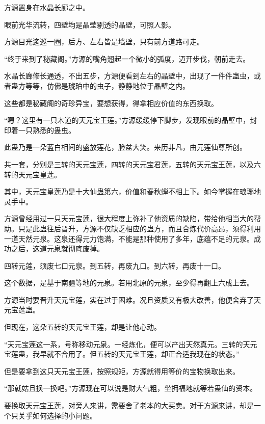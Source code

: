 
\begin{this_body}



方源置身在水晶长廊之中。

眼前光华流转，四壁均是晶莹剔透的晶壁，可照人影。

方源目光逡巡一圈，后方、左右皆是墙壁，只有前方道路可走。

“终于来到了秘藏阁。”方源的嘴角翘起一个微小的弧度，迈开步伐，朝前走去。

水晶长廊修长通透，不出五步，方源便看到左右的晶壁中，出现了一件件蛊虫，或者蛊方等等，仿佛是琥珀中的虫子，静静地位于晶壁之内。

这些都是秘藏阁的奇珍异宝，要想获得，得拿相应价值的东西换取。

“嗯？这里有一只木道的天元宝王莲。”方源缓缓停下脚步，发现眼前的晶壁中，封印着一只熟悉的蛊虫。

此蛊乃是一朵蓝白相间的盛放莲花，脸盆大笑。来历非凡，由元莲仙尊所创。

共一套，分别是三转的天元宝莲，四转的天元宝君莲，五转的天元宝王莲，以及六转的天元宝皇莲。

其中，天元宝皇莲乃是十大仙蛊第六，价值和春秋蝉不相上下。如今掌握在琅琊地灵手中。

方源曾经用过一只天元宝莲，很大程度上弥补了他资质的缺陷，带给他相当大的帮助。只是此蛊往后晋升，方源不仅缺乏相应的蛊方，而且合炼代价高昂，须得利用一道天然元泉。这泉还得元力饱满，不能是那种使用了多年，底蕴不足的元泉。成功之后，这道元泉就彻底废掉。

四转元莲，须废七口元泉。到五转，再废九口。到六转，再废十一口。

这个数据，是基于南疆等地的元泉。若用北原的元泉，至少得再翻上六成上去。

方源当时要晋升天元宝莲，实在过于困难。况且资质又有极大改善，他便舍弃了天元宝莲蛊。

但现在，这朵五转的天元宝王莲，却是让他心动。

“天元宝莲这一系，号称移动元泉。一经炼化，便可以产出天然真元。三转的天元宝莲蛊，我早就不合用了。但五转的天元宝王莲，却正合适我现在的状态。”

但是要拿到这只天元宝王莲，按照规矩，方源就得用等价的宝物换取出来。

“那就姑且换一换吧。”方源现在可以说是财大气粗，坐拥福地就等若蛊仙的资本。

要换取天元宝王莲，对旁人来讲，需要舍了老本的大买卖。对于方源来讲，却是一个只关乎如何选择的小问题。


\end{this_body}
